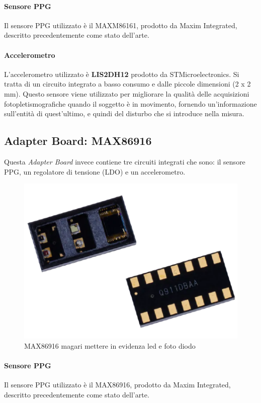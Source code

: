 \paragraph{Sensore PPG} Il sensore PPG utilizzato è il MAXM86161, prodotto da Maxim Integrated, descritto precedentemente come stato dell'arte.

\paragraph{Accelerometro} L'accelerometro utilizzato è \textbf{LIS2DH12} prodotto da STMicroelectronics. Si tratta di un circuito integrato a basso consumo e dalle piccole dimensioni (2 x 2 mm). Questo sensore viene utilizzato per migliorare la qualità delle acquisizioni fotopletismografiche quando il soggetto è in movimento, fornendo un'informazione sull'entità di quest'ultimo, e quindi del disturbo che si introduce nella misura. 

\subsection{Adapter Board: MAX86916}
Questa \textit{Adapter Board} invece contiene tre circuiti integrati che sono: il sensore PPG, un regolatore di tensione (LDO) e un accelerometro.
\begin{figure}[h]
	\centering
	\includegraphics[width=0.6\linewidth]{ImageFiles/Hardware/MAX86916_Layout}
	\caption{MAX86916 magari mettere in evidenza led e foto diodo}
	\label{fig:xxxx}
\end{figure}

\paragraph{Sensore PPG} Il sensore PPG utilizzato è il MAX86916, prodotto da Maxim Integrated, descritto precedentemente come stato dell'arte.

